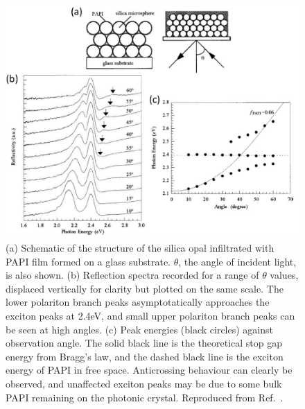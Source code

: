 \begin{figure}[h!]
\centering
\includegraphics[width=\textwidth]{Fig21}
\caption{(a) Schematic of the structure of the silica opal infiltrated with PAPI film formed on a glass substrate. $\theta$, the angle of incident light, is also shown. (b) Reflection spectra recorded for a range of $\theta$ values, displaced vertically for clarity but plotted on the same scale. The lower polariton branch peaks asymptotatically approaches the exciton peaks at 2.4eV, and small upper polariton branch peaks can be seen at high angles. (c) Peak energies (black circles) against observation angle. The solid black line is the theoretical stop gap energy from Bragg's law, and the dashed black line is the exciton energy of PAPI in free space. Anticrossing behaviour can clearly be observed, and unaffected exciton peaks may be due to some bulk PAPI remaining on the photonic crystal. Reproduced from Ref.\ \cite{Sumioka2001}.}
\label{2Fig21}
\end{figure}

